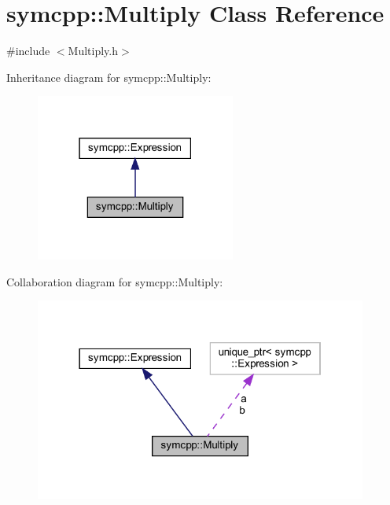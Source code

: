 \hypertarget{classsymcpp_1_1Multiply}{}\section{symcpp\+::Multiply Class Reference}
\label{classsymcpp_1_1Multiply}


{\ttfamily \#include $<$Multiply.\+h$>$}



Inheritance diagram for symcpp\+::Multiply\+:
\nopagebreak
\begin{figure}[H]
\begin{center}
\leavevmode
\includegraphics[width=186pt]{classsymcpp_1_1Multiply__inherit__graph}
\end{center}
\end{figure}


Collaboration diagram for symcpp\+::Multiply\+:
\nopagebreak
\begin{figure}[H]
\begin{center}
\leavevmode
\includegraphics[width=310pt]{classsymcpp_1_1Multiply__coll__graph}
\end{center}
\end{figure}
